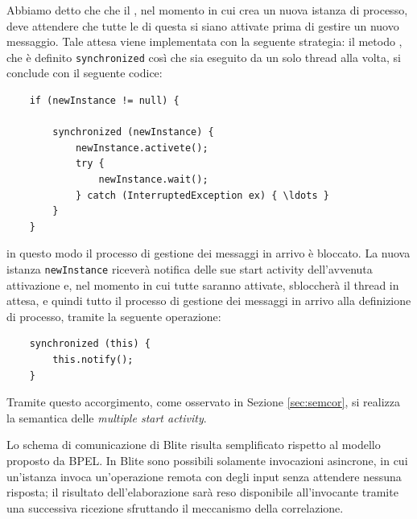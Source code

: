 Abbiamo detto che che il , nel momento in cui crea un nuova
istanza di processo, deve attendere che tutte le  di questa
si siano attivate prima di gestire un nuovo messaggio.
Tale attesa viene implementata con la seguente strategia: il metodo
, che è definito \texttt{synchronized} così che
sia eseguito da un solo thread alla volta, si conclude con il seguente codice:
\begin{lstlisting}
	if (newInstance != null) {
            
		synchronized (newInstance) {
			newInstance.activete();
			try {
				newInstance.wait();
    		} catch (InterruptedException ex) { \ldots }
    	}
	}
\end{lstlisting}
in questo modo il processo di gestione dei messaggi in arrivo è bloccato. La
nuova istanza \texttt{newInstance} riceverà notifica delle sue start activity
dell'avvenuta attivazione e, nel momento in cui tutte saranno attivate,
sbloccherà il thread in attesa, e quindi tutto il processo di gestione dei
messaggi in arrivo alla definizione di processo, tramite la seguente operazione:
\begin{lstlisting}
	synchronized (this) {
    	this.notify();
    }
\end{lstlisting}
Tramite questo accorgimento, come osservato in Sezione \ref{sec:semcor}, si
realizza la semantica delle \emph{multiple start activity}.
\vspace{0.5cm}

Lo schema di comunicazione di Blite risulta semplificato rispetto al modello
proposto da BPEL. In Blite sono possibili solamente invocazioni asincrone, in
cui un'istanza invoca un'operazione remota con degli input senza attendere
nessuna risposta; il risultato dell'elaborazione sarà reso disponibile
all'invocante tramite una successiva ricezione sfruttando il meccanismo della
correlazione. 

